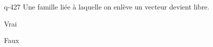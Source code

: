 \begin{truefalse}{q-427}
Une famille liée à laquelle on enlève un vecteur devient libre.
\item Vrai
\item* Faux
\end{truefalse}

